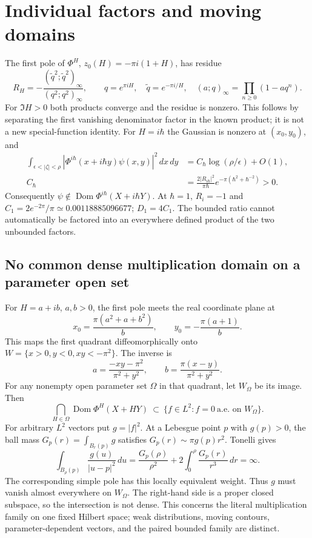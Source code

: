 \documentclass[11pt,a4paper]{article}
\newcommand{\Dom}{\operatorname{Dom}}
\begin{document}
\newpage
\section{Individual factors and moving domains}
The first pole of $\Phi^H$, $z_0(H)=-\pi i(1+H)$, has residue
\[
 R_H=-\frac{(\widetilde q^2;\widetilde q^2)_\infty}
                {(q^2;q^2)_\infty},
 \qquad q=e^{\pi iH},\quad\widetilde q=e^{-\pi i/H},
 \quad (a;q)_\infty=\prod_{n\geq0}(1-aq^n).
\]
For $\Im H>0$ both products converge and the residue is nonzero.
This follows by separating the first vanishing denominator
factor in the known product; it is not a new special-function identity.
For $H=i\hbar$ the Gaussian is nonzero at $(x_0,y_0)$, and
\begin{align}
 \int_{\epsilon<|\zeta|<\rho}
       |\Phi^{i\hbar}(x+i\hbar y)\psi(x,y)|^2\,dx\,dy
 &=C_\hbar\log(\rho/\epsilon)+O(1),\\
 C_\hbar&=\frac{2|R_{i\hbar}|^2}{\pi\hbar}
       e^{-\pi(\hbar^2+\hbar^{-2})}>0 .
\end{align}
Consequently $\psi\notin\Dom\Phi^{i\hbar}(X+i\hbar Y)$.
At $\hbar=1$, $R_i=-1$ and $C_1=2e^{-2\pi}/\pi
\simeq0.00118885096677$; $D_1=4C_1$.
The bounded ratio cannot automatically be factored into an everywhere
defined product of the two unbounded factors.

\subsection*{No common dense multiplication domain on a parameter open set}
For $H=a+ib$, $a,b>0$, the first pole meets the real coordinate plane at
\[
 x_0=\frac{\pi(a^2+a+b^2)}b,\qquad
 y_0=-\frac{\pi(a+1)}b.
\]
This maps the first quadrant diffeomorphically onto
$W=\{x>0,y<0,xy<-\pi^2\}$. The inverse is
\[
 a=\frac{-xy-\pi^2}{\pi^2+y^2},\qquad
 b=\frac{\pi(x-y)}{\pi^2+y^2}.
\]
For any nonempty open parameter set $\Omega$ in that quadrant, let
$W_\Omega$ be its image. Then
\[
 \bigcap_{H\in\Omega}\Dom\Phi^H(X+HY)
 \ \subset\ \{f\in L^2:f=0\ \text{a.e. on }W_\Omega\}.
\]
For arbitrary $L^2$ vectors put $g=|f|^2$.
At a Lebesgue point $p$ with $g(p)>0$, the ball mass
$G_p(r)=\int_{B_r(p)}g$ satisfies $G_p(r)\sim\pi g(p)r^2$.
Tonelli gives
\[
 \int_{B_\rho(p)}\frac{g(u)}{|u-p|^2}\,du
 =\frac{G_p(\rho)}{\rho^2}
       +2\int_0^\rho\frac{G_p(r)}{r^3}\,dr=\infty.
\]
The corresponding simple pole has this locally equivalent weight.
Thus $g$ must vanish almost everywhere on $W_\Omega$.
The right-hand side is a proper closed subspace, so the intersection is
not dense. This concerns the literal multiplication family on one fixed
Hilbert space; weak distributions, moving contours, parameter-dependent
vectors, and the paired bounded family are distinct.
\end{document}
